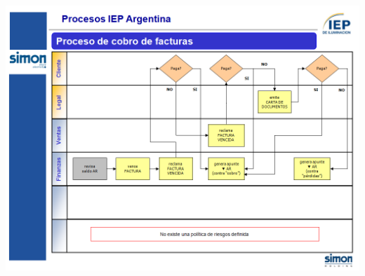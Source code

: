 \begin{center}
 \includegraphics[angle=90,scale=0.80,keepaspectratio=true]{./Images/Procesos-Circuitos-Originales-IEP/Circuito-Cobranzas-IEP.png}
\end{center}
